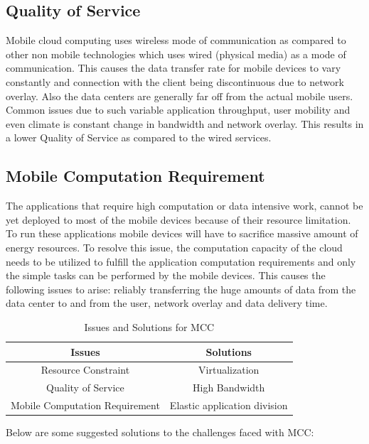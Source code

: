 \documentclass[10pt, conference, compsocconf]{IEEEtran}
\begin{document}
\subsection{Quality of Service}
Mobile cloud computing uses wireless mode of communication as compared to other non mobile technologies which uses wired (physical media) as a mode of communication. This causes the data transfer rate for mobile devices to vary constantly and connection with the client being discontinuous due to network overlay. Also the data centers are generally far off from the actual mobile users. Common issues due to such variable application throughput, user mobility and even climate is constant change in bandwidth and network overlay. This results in a lower Quality of Service as compared to the wired services.
\subsection{Mobile Computation Requirement}
The applications that require high computation or data intensive work, cannot be yet deployed to most of the mobile devices because of their resource limitation. To run these applications mobile devices will have to sacrifice massive amount of energy resources.   To resolve this issue, the computation capacity of the cloud needs to be utilized to fulfill the application computation requirements and only the simple tasks can be performed by the mobile devices. This causes the following issues to arise: reliably transferring the huge amounts of data from the data center to and from the user, network overlay and data delivery time.


\begin{table}[h]
\caption{Issues and Solutions for MCC}
\label{table_example}
\begin{center}
\begin{tabular}{|c||c|}
\hline
\textbf{Issues} & \textbf{Solutions}\\
\hline
Resource Constraint & Virtualization\\
\hline
Quality of Service & High Bandwidth\\
\hline
Mobile Computation Requirement & Elastic application division\\
\hline
\end{tabular}
\end{center}
\end{table}


Below are some suggested solutions to the challenges faced with MCC:
\end{document}
